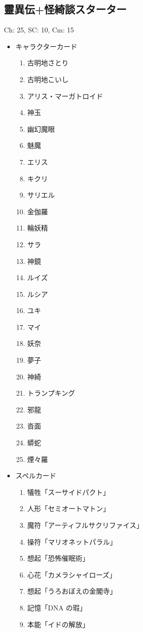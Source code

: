 \documentclass[line_length=22zw,number_of_lines=45,twocolumn]{jlreq}
\begin{document}
\subsection{靈異伝+怪綺談スターター}
Ch: 25, SC: 10, Cm: 15
\begin{itemize}
	\item キャラクターカード
		\begin{enumerate}
			\item 古明地さとり
			\item 古明地こいし
			\item アリス・マーガトロイド
			\item 神玉
			\item 幽幻魔眼
			\item 魅魔
			\item エリス
			\item キクリ
			\item サリエル
			\item 金伽羅
			\item 輪妖精
			\item サラ
			\item 神鏡
			\item ルイズ
			\item ルシア
			\item ユキ
			\item マイ
			\item 妖奈
			\item 夢子
			\item 神綺
			\item トランプキング
			\item 邪龍
			\item 沓面
			\item 蟒蛇
			\item 煙々羅
		\end{enumerate}
	\item スペルカード
		\begin{enumerate}
			\item 犠牲「スーサイドパクト」
			\item 人形「セミオートマトン」
			\item 魔符「アーティフルサクリファイス」
			\item 操符「マリオネットパラル」
			\item 想起「恐怖催眠術」
			\item 心花「カメラシャイローズ」
			\item 想起「うろおぼえの金閣寺」
			\item 記憶「DNA の瑕」
			\item 本能「イドの解放」

\end{enumerate}
\end{itemize}
\end{document}
